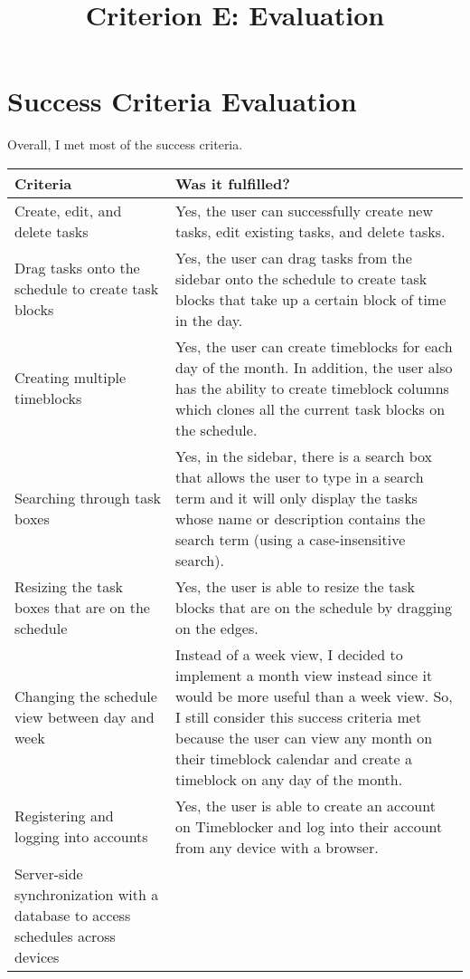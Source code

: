 \documentclass[12pt]{report}
\title{Criterion E: Evaluation}
\begin{document}
\centerline{\textcolor{msblue}{
		\textbf{\fontsize{13}{13}\MyTitle}
	}}



\section*{Success Criteria Evaluation}

Overall, I met most of the success criteria.

\def\arraystretch{1.5}
\begin{xltabular}{\textwidth}{|X|X|}
	\hline
	\textbf{Criteria}
	&
	\textbf{Was it fulfilled?}
	\\\hline
	Create, edit, and delete tasks
	&
	Yes, the user can successfully create new tasks, edit existing tasks, and delete tasks.
	\\\hline
	Drag tasks onto the schedule to create task blocks
	&
	Yes, the user can drag tasks from the sidebar onto the schedule to create task blocks that take up a certain block of time in the day.
	\\\hline
	Creating multiple timeblocks
	&
	Yes, the user can create timeblocks for each day of the month. In addition, the user also has the ability to create timeblock columns which clones all the current task blocks on the schedule.
	\\\hline
	Searching through task boxes
	&
	Yes, in the sidebar, there is a search box that allows the user to type in a search term and it will only display the tasks whose name or description contains the search term (using a case-insensitive search).
	\\\hline
	Resizing the task boxes that are on the schedule
	&
	Yes, the user is able to resize the task blocks that are on the schedule by dragging on the edges.
	\\\hline
	Changing the schedule view between day and week
	&
	Instead of a week view, I decided to implement a month view instead since it would be more useful than a week view. So, I still consider this success criteria met because the user can view any month on their timeblock calendar and create a timeblock on any day of the month.
	\\\hline
	Registering and logging into accounts
	&
	Yes, the user is able to create an account on Timeblocker and log into their account from any device with a browser.
	\\\hline
	Server-side synchronization with a database to access schedules across devices

\end{xltabular}
\end{document}
